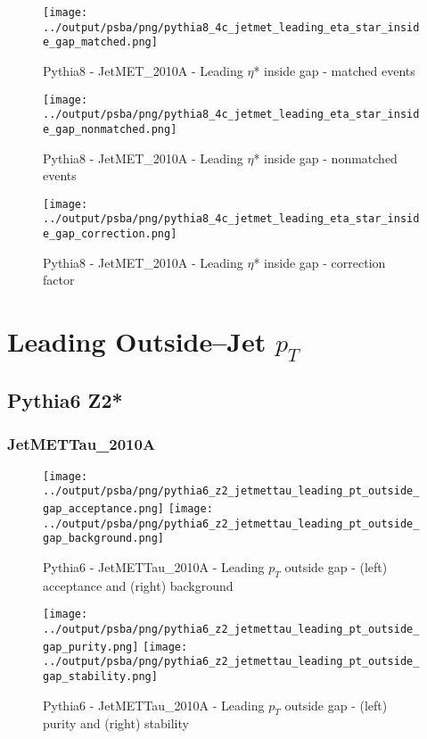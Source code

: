 \documentclass[11pt]{book}
\begin{document}
\begin{figure}[ht]
\centering
\texttt{[image: ../output/psba/png/pythia8\_4c\_jetmet\_leading\_eta\_star\_inside\_gap\_matched.png]}
\caption{Pythia8 - JetMET\_2010A - Leading $\eta$* inside gap - matched events}
\label{fig:p8_jetmet_leading_eta_star_inside_gap_matched}
\end{figure}

\begin{figure}[ht]
\centering
\texttt{[image: ../output/psba/png/pythia8\_4c\_jetmet\_leading\_eta\_star\_inside\_gap\_nonmatched.png]}
\caption{Pythia8 - JetMET\_2010A - Leading $\eta$* inside gap - nonmatched events}
\label{fig:p8_jetmet_leading_eta_star_inside_gap_nonmatched}
\end{figure}

\begin{figure}[ht]
\centering
\texttt{[image: ../output/psba/png/pythia8\_4c\_jetmet\_leading\_eta\_star\_inside\_gap\_correction.png]}
\caption{Pythia8 - JetMET\_2010A - Leading $\eta$* inside gap - correction factor}
\label{fig:p8_jetmet_leading_eta_star_inside_gap_correction}
\end{figure}



\clearpage
\chapter{Leading Outside--Jet $p_{T}$}
\section{Pythia6 Z2*}
\subsection{JetMETTau\_2010A}

\begin{figure}[ht]
\centering
\texttt{[image: ../output/psba/png/pythia6\_z2\_jetmettau\_leading\_pt\_outside\_gap\_acceptance.png]}
\texttt{[image: ../output/psba/png/pythia6\_z2\_jetmettau\_leading\_pt\_outside\_gap\_background.png]}
\caption{Pythia6 - JetMETTau\_2010A - Leading $p_{T}$ outside gap - (left) acceptance and (right) background}
\label{fig:p6_jetmettau_leading_pt_outside_gap_ab}
\end{figure}

\begin{figure}[ht]
\centering
\texttt{[image: ../output/psba/png/pythia6\_z2\_jetmettau\_leading\_pt\_outside\_gap\_purity.png]}
\texttt{[image: ../output/psba/png/pythia6\_z2\_jetmettau\_leading\_pt\_outside\_gap\_stability.png]}
\caption{Pythia6 - JetMETTau\_2010A - Leading $p_{T}$ outside gap - (left) purity and (right) stability}
\label{fig:p6_jetmettau_leading_pt_outside_gap_ps}
\end{figure}
\end{document}
